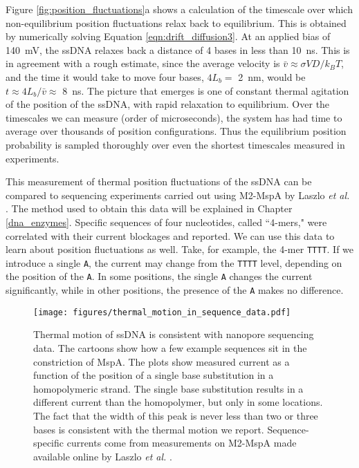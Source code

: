 Figure \ref{fig:position_fluctuations}a shows a calculation of the timescale over which non-equilibrium position fluctuations relax back to equilibrium.  This is obtained by numerically solving Equation \ref{eqn:drift_diffusion3}.  At an applied bias of \SI{140}{\mV}, the ssDNA relaxes back a distance of 4 bases in less than \SI{10}{\ns}.  This is in agreement with a rough estimate, since the average velocity is $\bar{v} \approx \sigma V D / k_B T$, and the time it would take to move four bases, $4 L_b = $ \SI{2}{\nm}, would be $t \approx 4 L_b / \bar{v} \approx $ \SI{8}{\ns}.  The picture that emerges is one of constant thermal agitation of the position of the ssDNA, with rapid relaxation to equilibrium.  Over the timescales we can measure (order of microseconds), the system has had time to average over thousands of position configurations.  Thus the equilibrium position probability is sampled thoroughly over even the shortest timescales measured in experiments.

This measurement of thermal position fluctuations of the ssDNA can be compared to sequencing experiments carried out using M2-MspA by Laszlo \textit{et al.} \citep{Laszlo2014}.  The method used to obtain this data will be explained in Chapter \ref{dna_enzymes}.  Specific sequences of four nucleotides, called ``4-mers," were correlated with their current blockages and reported.  We can use this data to learn about position fluctuations as well.  Take, for example, the 4-mer \texttt{TTTT}.  If we introduce a single \texttt{A}, the current may change from the \texttt{TTTT} level, depending on the position of the \texttt{A}.  In some positions, the single \texttt{A} changes the current significantly, while in other positions, the presence of the \texttt{A} makes no difference.

\begin{figure}[H] %
\begin{centering}
\texttt{[image: figures/thermal\_motion\_in\_sequence\_data.pdf]}
\caption[Thermal motion averaging and sequencing data]{Thermal motion of ssDNA is consistent with nanopore sequencing data.  The cartoons show how a few example sequences sit in the constriction of MspA.  The plots show measured current as a function of the position of a single base substitution in a homopolymeric strand.  The single base substitution results in a different current than the homopolymer, but only in some locations.  The fact that the width of this peak is never less than two or three bases is consistent with the thermal motion we report.  Sequence-specific currents come from measurements on M2-MspA made available online by Laszlo \textit{et al.} \citep{Laszlo2014}.}
\label{fig:thermal_motion_sequencing}
\end{centering}
\end{figure}

